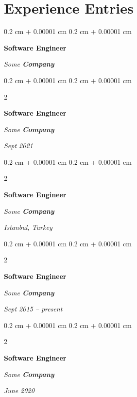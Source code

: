 \documentclass[10pt, letterpaper]{article}
\newenvironment{onecolentry}{
    \begin{adjustwidth}{
        0.2 cm + 0.00001 cm
    }{
        0.2 cm + 0.00001 cm
    }
}{
    \end{adjustwidth}
} %
\newenvironment{twocolentry}[2][]{
    \onecolentry
    \def\secondColumn{#2}
    \setcolumnwidth{\fill, 4.5 cm}
    \begin{paracol}{2}
}{
    \switchcolumn \raggedleft \secondColumn
    \end{paracol}
    \endonecolentry
} %
\begin{document}
    
    \section{Experience Entries}



        
        \begin{onecolentry}
            \textbf{Software Engineer}
            
            \textit{Some \textbf{Company}}
        \end{onecolentry}



        \vspace{0.2 cm}

        \begin{twocolentry}{
            
            
        \textit{Sept 2021}}
            \textbf{Software Engineer}
            
            \textit{Some \textbf{Company}}
        \end{twocolentry}



        \vspace{0.2 cm}

        \begin{twocolentry}{
        \textit{Istanbul, Turkey}    
            
        }
            \textbf{Software Engineer}
            
            \textit{Some \textbf{Company}}
        \end{twocolentry}



        \vspace{0.2 cm}

        \begin{twocolentry}{
            
            
        \textit{Sept 2015 – present}}
            \textbf{Software Engineer}
            
            \textit{Some \textbf{Company}}
        \end{twocolentry}



        \vspace{0.2 cm}

        \begin{twocolentry}{
            
            
        \textit{June 2020}}
            \textbf{Software Engineer}
            
            \textit{Some \textbf{Company}}
        \end{twocolentry}
\end{document}
